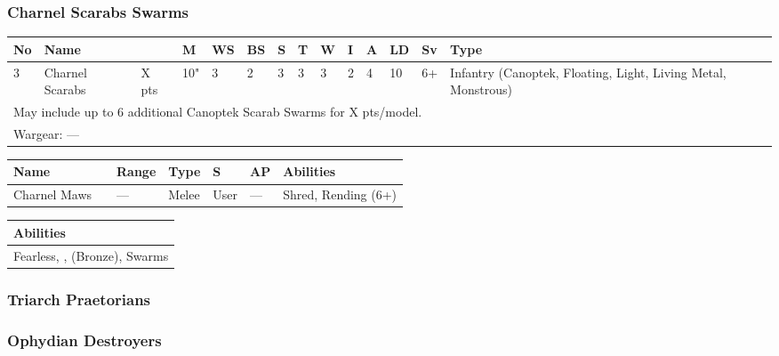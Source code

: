\subsubsection{Charnel Scarabs Swarms}

\noindent
\begin{tabular}{||m{10pt} m{90pt} m{30pt} m{11pt} m{11pt} m{11pt} m{11pt} m{11pt} m{11pt} m{11pt} m{11pt} m{11pt} m{11pt} m{135pt}||}
	\hline
	No & Name & & M & WS & BS & S & T & W & I & A & LD & Sv & Type \\
	\hline
	3 & Charnel Scarabs & X pts & 10" & 3 & 2 & 3 & 3 & 3 & 2 & 4 & 10 & 6+ & Infantry (Canoptek, Floating, Light, Living Metal, Monstrous)\\
	\hline
	\hline
	\multicolumn{14}{||Z{532 pt}||}{May include up to 6 additional Canoptek Scarab Swarms for X pts/model.}\\		
	\hline
	\hline
	\multicolumn{14}{||Z{532 pt}||}{Wargear: —}\\
	\hline
\end{tabular}

\noindent
\begin{tabular}{||m{110pt} m{30pt} m{31pt} m{55pt} m{12pt} m{12pt} m{210pt}||}
	\hline
	Name & & Range & Type & S & AP & Abilities \\
	\hline
	Charnel Maws & & — & Melee & User & — & Shred, Rending (6+) \\
	\hline
\end{tabular}

\noindent
\begin{tabular}{||m{532pt}||}
	\hline
	Abilities \\
	\hline
	Fearless, \quickref{Reanimation Protocols}, \quickref{Soulless Hordes} (Bronze), Swarms \\
	\hline
\end{tabular}



\newpage
\subsubsection{Triarch Praetorians}


\newpage
\subsubsection{Ophydian Destroyers}
 
